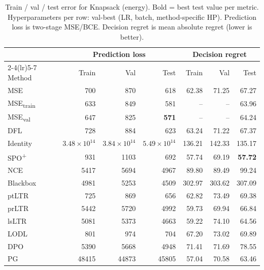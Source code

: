 \begin{table}[t]
\centering
\caption{Train / val / test error for Knapsack (energy). Bold = best test value per metric. Hyperparameters per row: val-best (LR, batch, method-specific HP). Prediction loss is two-stage MSE/BCE. Decision regret is mean absolute regret (lower is better).}
\label{tab:err-knapsack-real}
\setlength{\tabcolsep}{4pt}
\renewcommand{\arraystretch}{1.05}
\begin{tabular}{@{}lrrrrrr@{}}
\toprule
& \multicolumn{3}{c}{Prediction loss} & \multicolumn{3}{c}{Decision regret} \\
\cmidrule(lr){2-4}\cmidrule(lr){5-7}
Method & Train & Val & Test & Train & Val & Test \\
\midrule
MSE & 700 & 870 & 618 & 62.38 & 71.25 & 67.27 \\
MSE\textsubscript{train} & 633 & 849 & 581 & -- & -- & 63.96 \\
MSE\textsubscript{val} & 647 & 825 & \textbf{571} & -- & -- & 64.24 \\
DFL & 728 & 884 & 623 & 63.24 & 71.22 & 67.37 \\
Identity & $3.48{\times}10^{14}$ & $3.84{\times}10^{14}$ & $5.49{\times}10^{14}$ & 136.21 & 142.33 & 135.17 \\
SPO\textsuperscript{+} & 931 & 1103 & 692 & 57.74 & 69.19 & \textbf{57.72} \\
NCE & 5417 & 5694 & 4967 & 89.80 & 89.49 & 99.24 \\
Blackbox & 4981 & 5253 & 4509 & 302.97 & 303.62 & 307.09 \\
ptLTR & 725 & 869 & 656 & 62.82 & 73.49 & 69.38 \\
prLTR & 5442 & 5720 & 4992 & 59.73 & 69.94 & 66.84 \\
lsLTR & 5081 & 5373 & 4663 & 59.22 & 74.10 & 64.56 \\
LODL & 801 & 974 & 704 & 67.20 & 73.02 & 69.89 \\
DPO & 5390 & 5668 & 4948 & 71.41 & 71.69 & 78.55 \\
PG & 48415 & 44873 & 45805 & 57.04 & 70.58 & 63.46 \\
\bottomrule
\end{tabular}
\end{table}

